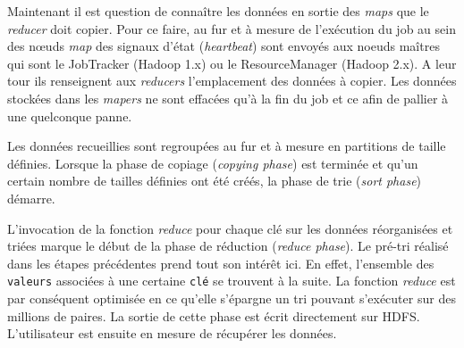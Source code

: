 \par Maintenant il est question de connaître les données en sortie des \emph{maps} que le \emph{reducer} doit copier. Pour ce faire, au fur et à mesure de l'exécution du job au sein des n\oe{}uds \emph{map} des signaux d'état (\emph{heartbeat}) sont envoyés aux noeuds maîtres qui sont le JobTracker (Hadoop 1.x) ou le ResourceManager (Hadoop 2.x). A leur tour ils renseignent aux \emph{reducers} l'emplacement des données à copier. Les données stockées dans les \emph{mapers} ne sont effacées qu'à la fin du job et ce afin de pallier à une quelconque panne.

\par Les données recueillies sont regroupées au fur et à mesure en partitions de taille définies. Lorsque la phase de copiage (\emph{copying phase}) est terminée et qu'un certain nombre de tailles définies ont été créés, la phase de trie (\emph{sort phase}) démarre.

\par L'invocation de la fonction \emph{reduce} pour chaque clé sur les données réorganisées et triées marque le début de la phase de réduction (\emph{reduce phase}). Le pré-tri réalisé dans les étapes précédentes prend tout son intérêt ici. En effet, l'ensemble des \texttt{valeurs} associées à une certaine \texttt{clé} se trouvent à la suite. La fonction \emph{reduce} est par conséquent optimisée en ce qu'elle s'épargne un tri pouvant s'exécuter sur des millions de paires. La sortie de cette phase est écrit directement sur HDFS. L'utilisateur est ensuite en mesure de récupérer les données.


